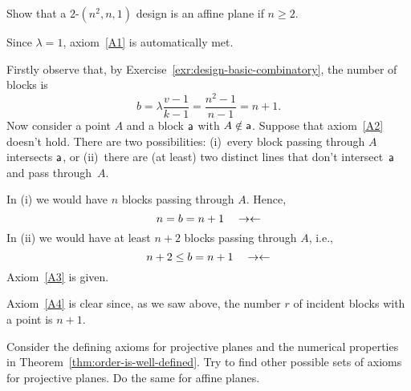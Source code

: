 \begin{exr}\label{exr:design-affine-plane}
    Show that a\/ $2$-$(n^2, n, 1)$ design is an affine plane if\/ $n \geq 2$.
\end{exr}

\begin{solution}
    Since $\lambda=1$, axiom~\ref{A1} is automatically met.

    Firstly observe that, by Exercise~\ref{exr:design-basic-combinatory}, the number of blocks is
    $$
        b=\lambda\frac{v-1}{k-1}=\frac{n^2-1}{n-1}=n+1.
    $$
    Now consider a point $A$ and a block $\mathsf a$ with $A\notin\mathsf a$. Suppose that axiom~\ref{A2} doesn't hold. There are two possibilities: (i)~every block passing through $A$ intersects $\mathsf a$, or (ii)~there are (at least) two distinct lines that don't intersect~$\mathsf a$ and pass through~$A$.

    In (i) we would have $n$ blocks passing through $A$. Hence,
    $$
        n=b=n+1\quad\noend
    $$
    In (ii) we would have at least $n+2$ blocks passing through $A$, i.e.,
    $$
        n+2\le b=n+1\quad\noend
    $$
    Axiom~\ref{A3} is given.

    Axiom~\ref{A4} is clear since, as we saw above, the number $r$ of incident blocks with a point is $n+1$.
    
\end{solution}


\begin{exr}
    Consider the defining axioms for projective planes and the numerical properties in\/ {\upshape Theorem~\ref{thm:order-is-well-defined}}. Try to find other possible sets of axioms for projective planes. Do the same for affine planes.
\end{exr}


